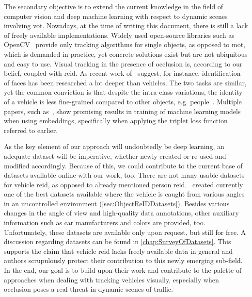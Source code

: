 The secondary objective is to extend the current knowledge in the field of computer vision and deep machine learning with respect to dynamic scenes involving \gls{vot}. Nowadays, at the time of writing this document, there is still a lack of freely available implementations. Widely used open-source libraries such as OpenCV~\cite{opencv_library} provide only tracking algorithms for single objects, as opposed to \gls{mot}, which is demanded in practice, yet concrete solutions exist but are not ubiquitous and easy to use. Visual tracking in the presence of occlusion is, according to our belief, coupled with \gls{reid}. As recent work of~\cite{Kuma2019} suggest, for instance, identification of faces has been researched a lot deeper than vehicles. The two tasks are similar, yet the common conviction is that despite the intra-class variations, the identity of a vehicle is less fine-grained compared to other objects, e.g. people~\cite{Kuma2019}. Multiple papers, such as~\cite{Schroff2015, Hermans2017}, show promising results in training of machine learning models when using embeddings, specifically when applying the triplet loss function referred to earlier.

As the key element of our approach will undoubtedly be deep learning, an adequate dataset will be imperative, whether newly created or re-used and modified accordingly. Because of this, we could contribute to the current base of datasets available online with our work, too. There are not many usable datasets for vehicle \gls{reid}, as opposed to already mentioned person \gls{reid}.~\cite{Liu2018, yan2017exploiting} created currently one of the best datasets available where the vehicle is caught from various angles in an uncontrolled environment (\cref{sec:ObjectReIDDatasets}). Besides various changes in the angle of view and high-quality data annotations, other auxiliary information such as car manufacturers and colors are provided, too. Unfortunately, these datasets are available only upon request, but still for free. A discussion regarding datasets can be found in \cref{chap:SurveyOfDatasets}. This supports the claim that vehicle \gls{reid} lacks freely available data in general and authors scrupulously protect their contribution to this newly emerging sub-field. In the end, our goal is to build upon their work and contribute to the palette of approaches when dealing with tracking vehicles visually, especially when occlusion poses a real threat in dynamic scenes of traffic.
